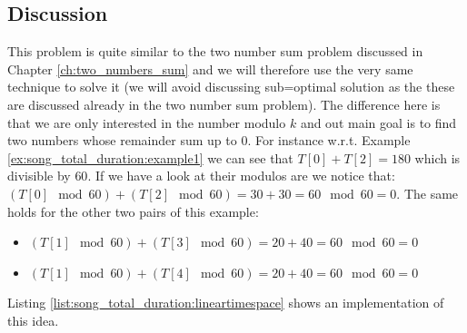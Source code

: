 \subsection{Discussion}
This problem is quite similar to the two number sum problem discussed in Chapter \ref{ch:two_numbers_sum} and we will therefore use the very same technique to solve it (we will avoid discussing sub=optimal solution as the these are discussed already in the two number sum problem).
The difference here is that we are only interested in the number modulo $k$ and out main goal is to find two numbers whose remainder sum up to $0$.
For instance w.r.t. Example \ref{ex:song_total_duration:example1} we can see that  $T[0]+T[2] = 180$ which is divisible by $60$. 
If we have a look at their modulos are we notice that: $(T[0] \mod{60}) +(T[2] \mod{60}) = 30+30 = 60 \mod{60} =0$.
The same holds for the other two pairs of this example:
\begin{itemize}
    \item $(T[1] \mod{60}) +(T[3] \mod{60}) = 20+40 = 60 \mod{60} =0$
    \item $(T[1] \mod{60}) +(T[4] \mod{60}) = 20+40 = 60 \mod{60} =0$
\end{itemize}


Listing \ref{list:song_total_duration:lineartimespace} shows an implementation of this idea.




